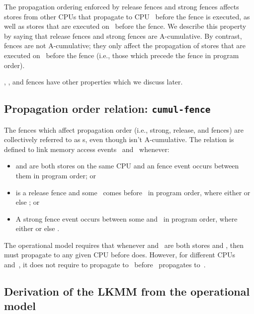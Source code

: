 The propagation ordering enforced by release fences and strong fences
affects stores from other CPUs that propagate to CPU~ before the
fence is executed, as well as stores that are executed on~ before the
fence.
We describe this property by saying that release fences and
strong fences are A-cumulative.
By contrast,  fences are not A-cumulative; they only
affect the propagation of stores that are executed on~ before
the fence (i.e., those which precede the fence in program order).

, , and 
fences have other properties which we discuss later.


\subsection{Propagation order relation: \texttt{cumul-fence}}
\label{sec:docs:explanation:Propagation order releation: cumul-fence}

The fences which affect propagation order (i.e., strong, release, and
 fences) are collectively referred to as s, even
though  isn't A-cumulative.
The  relation is defined to link memory access events~
and~ whenever:

\begin{itemize}
\item	{} and  are both stores on the same CPU and an  fence
	event occurs between them in program order; or

\item	{} is a release fence and some ~comes before~ in program order,
	where either  or else ; or

\item	A strong fence event occurs between some  and~ in program
	order, where either  or else .
\end{itemize}

The operational model requires that whenever  and~ are both stores
and , then  must propagate to any given CPU
before  does.
However, for different CPUs~ and~, it does not
require  to propagate to~ before~ propagates to~.


\subsection{Derivation of the LKMM from the operational model}
\label{sec:docs:explanation:Derivation of the LKMM from the operational model}

